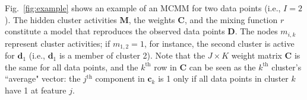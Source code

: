 Fig.~\ref{fig:example} shows an example of an MCMM for two data points (i.e., $I = 2$).
%
The hidden cluster activities $\mathbf{M}$, the weights $\mathbf{C}$,
and the mixing function $r$ constitute a model that reproduces the
observed data points $\mathbf{D}$.
%
%
The nodes $m_{i,k}$ represent cluster activities; if $m_{1,2} = 1$,
for instance, the second cluster is active for $\mathbf{d}_1$ (i.e.,
$\mathbf{d}_1$ is a member of cluster 2).
%
Note that the $J \times K$ weight matrix $\mathbf{C}$ is the same for
all data points, and
%
%
the $k^{\text{th}}$ row in $\mathbf{C}$ can be seen as the $k^{\text{th}}$
cluster's ``average" vector: the $j^{\text{th}}$ component in
$\mathbf{c}_k$ is 1 only if all data points in cluster $k$ have
1 at feature $j$.
%

